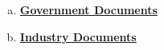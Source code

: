 \begin{enumerate}[(a)]
	\item \textbf{\underline{Government Documents}}
	\item \textbf{\underline{Industry Documents}}
		
		
		
	
\end{enumerate}

%
%
%

